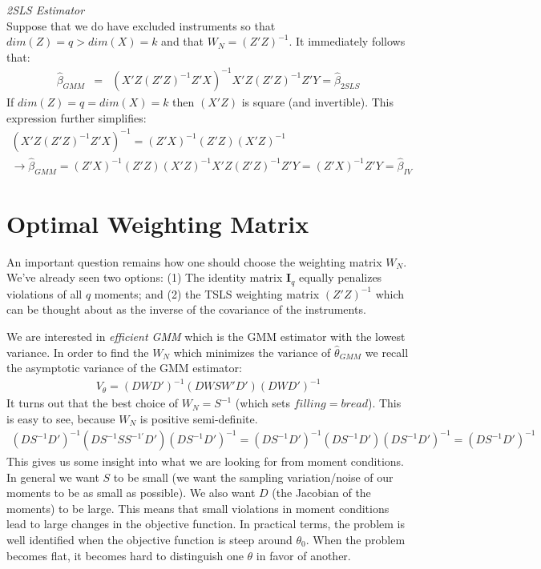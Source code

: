 \documentclass[a4paper]{article}
\begin{document}
\noindent \textit{2SLS Estimator}\\
Suppose that we do have excluded instruments so that $dim(Z) = q > dim(X) = k$ and that $W_N = (Z'Z)^{-1}$. It immediately follows that:
\begin{eqnarray*}
\hat{\beta}_{GMM} &=& (X'Z (Z'Z)^{-1} Z' X)^{-1} X' Z (Z'Z)^{-1} Z'Y = \hat{\beta}_{2SLS}
\end{eqnarray*}
If $dim(Z) = q = dim(X) = k$ then $(X'Z)$ is square (and invertible). This expression further simplifies:
\begin{eqnarray*}
(X'Z (Z'Z)^{-1} Z' X)^{-1} = (Z'X)^{-1} (Z'Z) (X'Z)^{-1}\\
\rightarrow \hat{\beta}_{GMM} = (Z'X)^{-1} (Z'Z) (X'Z)^{-1}  X' Z (Z'Z)^{-1} Z'Y = (Z'X)^{-1} Z'Y = \hat{\beta}_{IV}
\end{eqnarray*}


\section*{\normalsize  Optimal Weighting Matrix}
An important question remains how one should choose the weighting matrix $W_N$. We've already seen two options: (1) The identity matrix $\symbf{I}_q$ equally penalizes violations of all $q$ moments; and (2) the TSLS weighting matrix $(Z'Z)^{-1}$ which can be thought about as the inverse of the covariance of the instruments. 


We are interested in \textit{efficient GMM} which is the GMM estimator with the lowest variance. In order to find the $W_N$ which minimizes the variance of $\hat{\theta}_{GMM}$ we recall the asymptotic variance of the GMM estimator:
\begin{eqnarray*}
V_{\theta} =(D W D')^{-1} (D W S W' D') (D W D')^{-1}
\end{eqnarray*}
It turns out that the best choice of $W_N = S^{-1}$ (which sets $filling = bread$). This is easy to see, because $W_N$ is positive semi-definite.
\begin{eqnarray*}
(D S^{-1} D')^{-1} (D S^{-1} S S^{-1'} D') (D S^{-1} D')^{-1} = (D S^{-1} D')^{-1} (D S^{-1} D') (D S^{-1} D')^{-1} = (D S^{-1} D')^{-1}
\end{eqnarray*}
This gives us some insight into what we are looking for from moment conditions. In general we want $S$ to be small (we want the sampling variation/noise of our moments to be as small as possible). We also want $D$ (the Jacobian of the moments) to be large. This means that small violations in moment conditions lead to large changes in the objective function. In practical terms, the problem is well identified when the objective function is steep around $\theta_0$. When the problem becomes flat, it becomes hard to distinguish one $\theta$ in favor of another.
\end{document}

